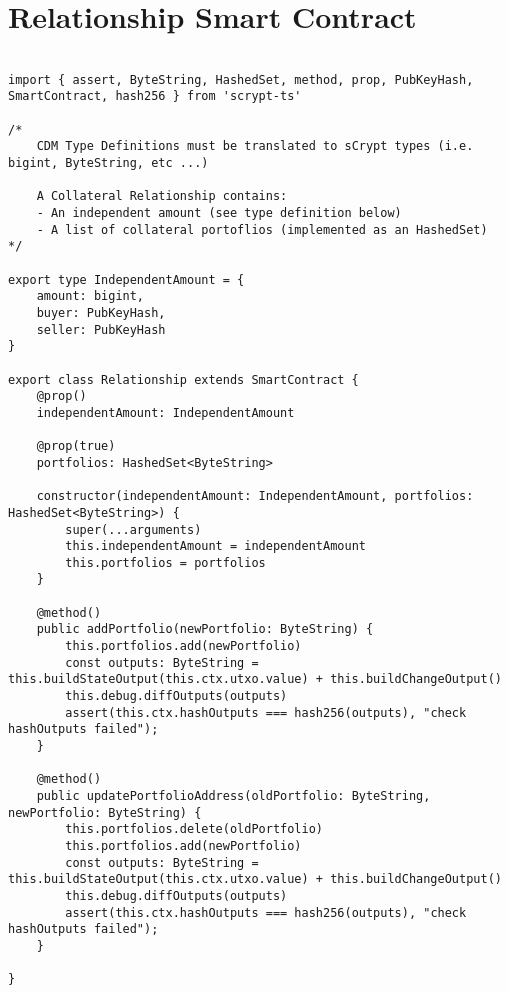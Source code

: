 \section{Relationship Smart Contract}
\label{app:relationship}


\begin{lstlisting}[style=htmlcssjs, caption=Relationship Smart Contract]

import { assert, ByteString, HashedSet, method, prop, PubKeyHash, SmartContract, hash256 } from 'scrypt-ts'

/*
    CDM Type Definitions must be translated to sCrypt types (i.e. bigint, ByteString, etc ...)

    A Collateral Relationship contains:
    - An independent amount (see type definition below)
    - A list of collateral portoflios (implemented as an HashedSet)
*/

export type IndependentAmount = {
    amount: bigint,
    buyer: PubKeyHash,
    seller: PubKeyHash
}

export class Relationship extends SmartContract {
    @prop()
    independentAmount: IndependentAmount
    
    @prop(true)
    portfolios: HashedSet<ByteString>

    constructor(independentAmount: IndependentAmount, portfolios: HashedSet<ByteString>) {
        super(...arguments)
        this.independentAmount = independentAmount
        this.portfolios = portfolios
    }

    @method()
    public addPortfolio(newPortfolio: ByteString) {
        this.portfolios.add(newPortfolio)
        const outputs: ByteString = this.buildStateOutput(this.ctx.utxo.value) + this.buildChangeOutput()
        this.debug.diffOutputs(outputs)
        assert(this.ctx.hashOutputs === hash256(outputs), "check hashOutputs failed");
    }

    @method()
    public updatePortfolioAddress(oldPortfolio: ByteString, newPortfolio: ByteString) {
        this.portfolios.delete(oldPortfolio)
        this.portfolios.add(newPortfolio)
        const outputs: ByteString = this.buildStateOutput(this.ctx.utxo.value) + this.buildChangeOutput()
        this.debug.diffOutputs(outputs)
        assert(this.ctx.hashOutputs === hash256(outputs), "check hashOutputs failed");
    }

}

\end{lstlisting}



